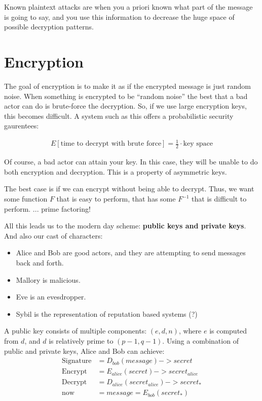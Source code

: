 \documentclass[twoside]{article}
\begin{document}
Known plaintext attacks are when you a priori known what part of the message is
going to say, and you use this information to decrease the huge space of
possible decryption patterns.

\section{Encryption}

The goal of encryption is to make it as if the encrypted message is just
random noise. When something is encrypted to be ``random noise'' the best that
a bad actor can do is brute-force the decryption. So, if we use large encryption
keys, this becomes difficult. A system such as this offers a probabilistic
security gaurentees:

\begin{align}
E[\text{time to decrypt with brute force}] = \frac{1}{2} \cdot \text{key space}
\end{align}

Of course, a bad actor can attain your key. In this case, they will be unable
to do both encryption and decryption. This is a property of asymmetric keys.

The best case is if we can encrypt without being able to decrypt. Thus, we want
some function $F$ that is easy to perform, that has some $F^{-1}$ that is
difficult to perform. ... prime factoring!

All this leads us to the modern day scheme: \textbf{public keys and private
keys}. And also our cast of characters:
\begin{itemize}
    \item Alice and Bob are good actors, and they are attempting to send
    messages back and forth.
    \item Mallory is malicious.
    \item Eve is an evesdropper.
    \item Sybil is the representation of reputation based systems (?)
\end{itemize}

A public key consists of multiple components: $(e, d, n)$, where $e$ is
computed from $d$, and $d$ is relatively prime to $(p-1, q-1)$. Using a
combination of public and private keys, Alice and Bob can achieve:
\begin{align}
\text{Signature} &= D_{bob} (message) -> secret \\
\text{Encrypt} &= E_{alice} (secret) -> secret_{alice} \\
\text{Decrypt} &= D_{alice} (secret_{alice}) -> secret_* \\
\text{now} &= message = E_{bob} (secret_*)
\end{align}
\end{document}

